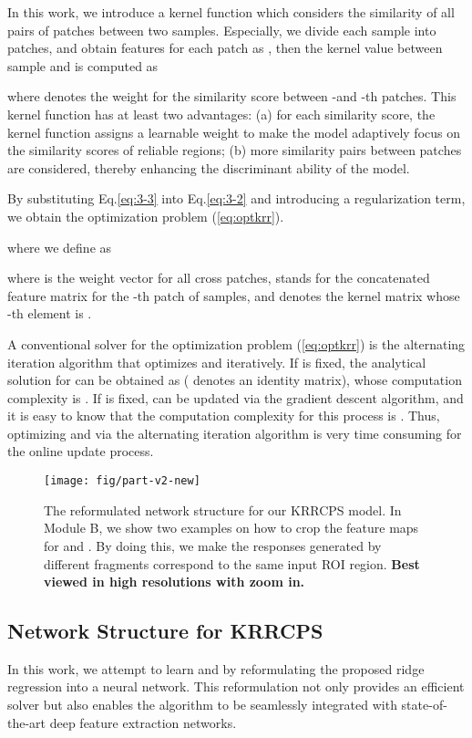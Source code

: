 \documentclass[10pt,twocolumn,letterpaper]{article}
\begin{document}
In this work, we introduce a kernel function which considers the similarity of all pairs of patches between two samples.
Especially, we divide each sample  into  patches, and obtain features for each patch  as ,
then the kernel value between sample  and  is computed as

where  denotes the weight for the similarity score between -and -th patches.
This kernel function has at least two advantages: (a) for each similarity score, the kernel function assigns a learnable
weight to make the model adaptively focus on the similarity scores of reliable regions; (b) more similarity pairs
between patches are considered, thereby enhancing the discriminant ability of the model.

By substituting Eq.\ref{eq:3-3} into Eq.\ref{eq:3-2} and introducing a regularization term, we obtain the
optimization problem (\ref{eq:optkrr}).

where we define  as

where  is the
weight vector for all cross patches, 
stands for the concatenated feature matrix for the -th patch of  samples, and
 denotes the kernel matrix whose -th element is .

A conventional solver for the optimization problem (\ref{eq:optkrr}) is the alternating
iteration algorithm that optimizes  and  iteratively. If
 is fixed, the analytical solution for  can be obtained as
  ( denotes an identity matrix), whose computation complexity is .
If  is fixed,  can be updated via the gradient descent algorithm,
and it is easy to know that the computation complexity for this process is .
Thus, optimizing  and  via the alternating
iteration algorithm is very time consuming for the online update process.


\begin{figure}[t]
\centering
\texttt{[image: fig/part-v2-new]}\\
\caption{The reformulated network structure for our KRRCPS model. In Module B, we show
two examples on how to crop the feature maps for  and .
By doing this, we make the responses generated by different fragments correspond to the same
 input ROI region.
  \textbf{Best viewed in high resolutions with
  zoom in.}}
  \label{fig:3-1}
  \vspace{-2mm}
\end{figure}




\subsection{Network Structure for KRRCPS}
In this work, we attempt to learn  and  by reformulating
the proposed ridge regression into a neural network. This reformulation not only provides
an efficient solver but also enables the algorithm to be seamlessly integrated with
state-of-the-art deep feature extraction networks.
\end{document}

